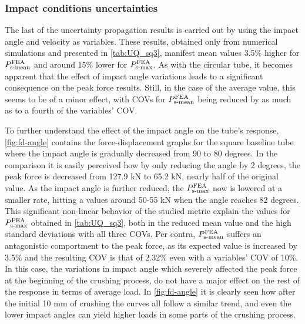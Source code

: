 \documentclass[12pt,number,preprint,review,times]{elsarticle}
\begin{document}
\subsubsection{Impact conditions uncertainties}

The last of the uncertainty propagation results is carried out by using the impact angle and velocity as variables. These results, obtained only from numerical simulations and presented in \cref{tab:UQ_sq3}, manifest mean values 3.5\% higher for $P^{\mathrm{FEA}}_{\mathrm{s{\text -}mean}}$ and around 15\% lower for $P^{\mathrm{FEA}}_{\mathrm{s{\text -}max}}$. As with the circular tube, it becomes apparent that the effect of impact angle variations leads to a significant consequence on the peak force results. Still, in the case of the average value, this seems to be of a minor effect, with COVs for $P^{\mathrm{FEA}}_{\mathrm{s{\text -}mean}}$ being reduced by as much as to a fourth of the variables' COV.

To further understand the effect of the impact angle on the tube's response, \cref{fig:fd-angle} contains the force-displacement graphs for the square baseline tube where the impact angle is gradually decreased from 90 to 80 degrees. In the comparison it is easily perceived how by only reducing the angle by 2 degrees, the peak force is decreased from 127.9 kN to 65.2 kN, nearly half of the original value. As the impact angle is further reduced, the $P^{\mathrm{FEA}}_{\mathrm{s{\text -}max}}$ now is lowered at a smaller rate, hitting a values around 50-55 kN when the angle reaches 82 degrees. This significant non-linear behavior of the studied metric explain the values for $P^{\mathrm{FEA}}_{\mathrm{s{\text -}max}}$ obtained in \cref{tab:UQ_sq3}, both in the reduced mean value and the high standard deviations with all three COVs. Per contra, $P^{\mathrm{FEA}}_{\mathrm{s{\text -}mean}}$ suffers an antagonistic comportment to the peak force, as its expected value is increased by 3.5\% and the resulting COV is that of 2.32\% even with a variables' COV of 10\%. In this case, the variations in impact angle which severely affected the peak force at the beginning of the crushing process, do not have a major effect on the rest of the response in terms of average load. In  \cref{fig:fd-angle} it is clearly seen how after the initial 10 mm of crushing the curves all follow a similar trend, and even the lower impact angles can yield higher loads in some parts of the crushing process.
\end{document}
